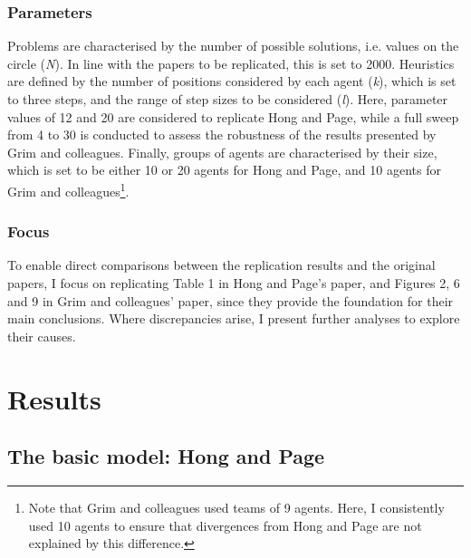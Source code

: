 \subsubsection{Parameters}

Problems are characterised by the number of possible solutions, i.e. values on the circle (\emph{N}). In line with the papers to be replicated, this is set to 2000. Heuristics are defined by the number of positions considered by each agent (\emph{k}), which is set to three steps, and the range of step sizes to be considered (\emph{l}). Here, parameter values of 12 and 20 are considered to replicate Hong and Page, while a full sweep from 4 to 30 is conducted to assess the robustness of the results presented by Grim and colleagues. Finally, groups of agents are characterised by their size, which is set to be either 10 or 20 agents for Hong and Page, and 10 agents for Grim and colleagues\footnote{Note that Grim and colleagues used teams of 9 agents. Here, I consistently used 10 agents to ensure that divergences from Hong and Page are not explained by this difference.}.

\subsubsection{Focus}

To enable direct comparisons between the replication results and the original papers, I focus on replicating Table 1 in Hong and Page's paper, and Figures 2, 6 and 9 in Grim and colleagues' paper, since they provide the foundation for their main conclusions. Where discrepancies arise, I present further analyses to explore their causes.

\section{Results}

\subsection{The basic model: Hong and Page}

